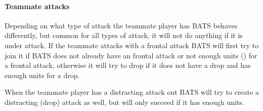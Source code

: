 \paragraph{Teammate attacks} Depending on what type of attack the teammate player has BATS behaves
differently, but common for all types of attack, it will not do anything if it is under attack. If
the teammate attacks with a frontal attack BATS will first try to join it if BATS does not already
have an frontal attack or not enough units (\classificationFrontalAttackUnitsMin) for a frontal attack,
otherwise it will try to drop if it does not have a drop and has enough units for a drop.

When the teammate player has a distracting attack out BATS will try to create a distracting (drop)
attack as well, but will only succeed if it has enough units.

